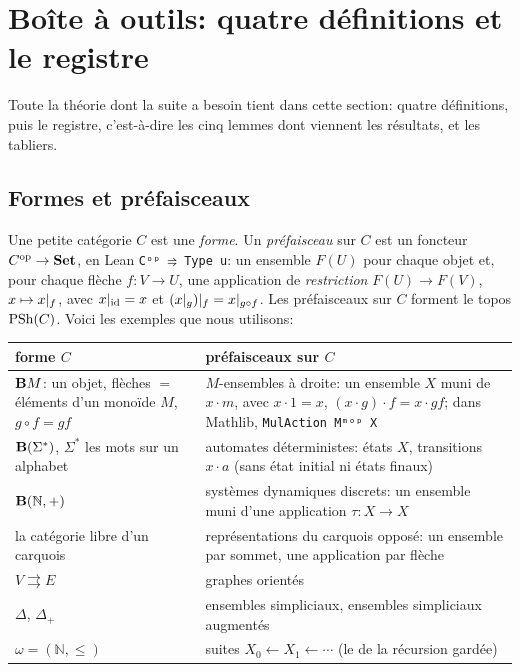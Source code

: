 \section{Boîte à outils: quatre définitions et le registre}\label{sec:toolbox}

Toute la théorie dont la suite a besoin tient dans cette section: quatre définitions, puis le registre, c'est-à-dire les cinq lemmes dont viennent les résultats, et les tabliers.

\subsection{Formes et préfaisceaux}

Une petite catégorie $C$ est une \emph{forme}. Un \emph{préfaisceau} sur $C$ est un foncteur $C^{\mathrm{op}}\to\mathbf{Set}$, en Lean \texttt{Cᵒᵖ ⥤ Type u}: un ensemble $F(U)$ pour chaque objet et, pour chaque flèche $f : V\to U$, une application de \emph{restriction} $F(U)\to F(V)$, $x\mapsto x|_{f}$, avec $x|_{\mathrm{id}} = x$ et $(x|_{g})|_{f} = x|_{g\circ f}$. Les préfaisceaux sur $C$ forment le topos $\mathrm{PSh}(C)$. Voici les exemples que nous utilisons:

\begin{center}\small
\begin{tabularx}{\linewidth}{>{\raggedright\arraybackslash}p{4.3cm}>{\raggedright\arraybackslash}X}
\toprule
forme $C$ & préfaisceaux sur $C$\\
\midrule
$\mathbf{B} M$: un objet, flèches $=$ éléments d'un monoïde $M$, $g\circ f = gf$ & $M$-ensembles à droite: un ensemble $X$ muni de $x\cdot m$, avec $x\cdot 1 = x$, $(x\cdot g)\cdot f = x\cdot gf$; dans Mathlib, \texttt{MulAction Mᵐᵒᵖ X}\\
$\mathbf{B}(\Sigma^*)$, $\Sigma^*$ les mots sur un alphabet & automates déterministes: états $X$, transitions $x\cdot a$ (sans état initial ni états finaux)\\
$\mathbf{B}(\mathbb N,+)$ & systèmes dynamiques discrets: un ensemble muni d'une application $\tau : X\to X$\\
la catégorie libre d'un carquois & représentations du carquois opposé: un ensemble par sommet, une application par flèche\\
$V\rightrightarrows E$ & graphes orientés\\
$\Delta$, $\Delta_+$ & ensembles simpliciaux, ensembles simpliciaux augmentés\\
$\omega = (\mathbb N,\le)$ & suites $X_0\leftarrow X_1\leftarrow\cdots$ (le \q{topos des arbres} de la récursion gardée)\\
\bottomrule
\end{tabularx}
\end{center}

